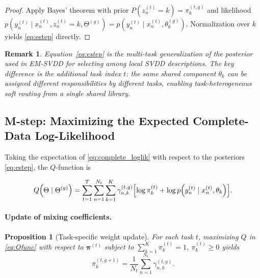 \documentclass[preprint,12pt]{elsarticle}
\newtheorem{proposition}{Proposition}
\newtheorem{remark}{Remark}
\begin{document}
	\begin{proof}
		Apply Bayes' theorem with prior $P(z_n^{(t)}=k) = \pi_k^{(t,g)}$
		and likelihood $p(y_n^{(t)} \mid x_n^{(t)}, z_n^{(t)}=k, \Theta^{(g)})
		= p(y_n^{(t)} \mid x_n^{(t)}, \theta_k^{(g)})$.
		Normalization over $k$ yields \eqref{eq:estep} directly.
	\end{proof}
	
	\begin{remark}
		Equation~\eqref{eq:estep} is the multi-task generalization of the
		posterior used in EM-SVDD \citep{eghdami2021sparsity} for selecting
		among local SVDD descriptions. The key difference is the additional
		task index $t$: the same shared component $\theta_k$ can be assigned
		different responsibilities by different tasks, enabling
		task-heterogeneous soft routing from a single shared library.
	\end{remark}
	
	\subsection{M-step: Maximizing the Expected Complete-Data Log-Likelihood}
	
	Taking the expectation of \eqref{eq:complete_loglik} with respect to
	the posteriors \eqref{eq:estep}, the $Q$-function is
	
	\begin{equation}
		Q\!\left(\Theta \mid \Theta^{(g)}\right)
		= \sum_{t=1}^T \sum_{n=1}^{N_t} \sum_{k=1}^K
		\gamma_{n,k}^{(t,g)}
		\Bigl[\log\pi_k^{(t)}
		+ \log p\!\left(y_n^{(t)}\mid x_n^{(t)},\theta_k\right)\Bigr].
		\label{eq:Qfunc}
	\end{equation}
	
	\paragraph{Update of mixing coefficients.}
	
	\begin{proposition}[Task-specific weight update]
		\label{prop:mstep_pi}
		For each task $t$, maximizing $Q$ in \eqref{eq:Qfunc} with respect
		to $\bm{\pi}^{(t)}$ subject to $\sum_{k=1}^K \pi_k^{(t)} = 1$,
		$\pi_k^{(t)} \ge 0$ yields
		\begin{equation}
			\pi_k^{(t,g+1)}
			= \frac{1}{N_t} \sum_{n=1}^{N_t} \gamma_{n,k}^{(t,g)}.
			\label{eq:pi_update}
		\end{equation}
	\end{proposition}
	
\end{document}
